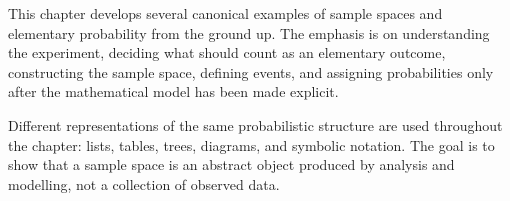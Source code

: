 This chapter develops several canonical examples of sample spaces and elementary probability from the ground up. The emphasis is on understanding the experiment, deciding what should count as an elementary outcome, constructing the sample space, defining events, and assigning probabilities only after the mathematical model has been made explicit.

Different representations of the same probabilistic structure are used throughout the chapter: lists, tables, trees, diagrams, and symbolic notation. The goal is to show that a sample space is an abstract object produced by analysis and modelling, not a collection of observed data.









